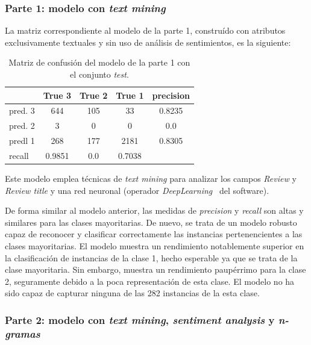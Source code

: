 \documentclass[es]{uc3mreport}
\begin{document}
\begin{report}
\subsubsection{Parte 1: modelo con \textit{text mining}}
\label{eva-modeloparte1}
La matriz correspondiente al modelo de la parte 1, construído con atributos
exclusivamente textuales y sin uso de análisis de sentimientos, es la siguiente:

\begin{table}[H]
\center
\begin{tabular}{@{}lccc|c@{}}
    \toprule
             & True 3 & True 2 & True 1 & precision\\
    \hline
    pred. 3  & 644 & 105       & 33     & 0.8235   \\
    pred. 2  & 3   & 0         & 0      & 0.0      \\
    predl 1  & 268 & 177       & 2181   & 0.8305   \\
    \hline
    recall   & 0.9851 & 0.0 & 0.7038 &          \\
    \bottomrule
\end{tabular}
\caption{Matriz de confusión del modelo de la parte 1 con el conjunto \textit{test}.}
\end{table}

Este modelo emplea técnicas de \textit{text mining} para analizar los campos
\textit{Review} y \textit{Review title} y una red neuronal (operador
\textit{DeepLearning}~\cite{deeplearning} del software). 

De forma similar al modelo anterior, las medidas de \textit{precision} y
\textit{recall} son altas y similares para las clases mayoritarias. De nuevo, se
trata de un modelo robusto capaz de reconocer y clasificar correctamente las
instancias pertenencientes a las clases mayoritarias. El modelo muestra un
rendimiento notablemente superior en la clasificación de instancias de la clase
1, hecho esperable ya que se trata de la clase mayoritaria. Sin embargo, muestra un
rendimiento paupérrimo para la clase 2, seguramente debido a la poca
representación de esta clase. El modelo no ha sido capaz de capturar ninguna de
las 282 instancias de la esta clase.

\subsubsection{Parte 2: modelo con \textit{text mining}, \textit{sentiment
analysis} y \textit{n-gramas}}
\label{eva-modeloparte2}


\end{report}
\end{document}
